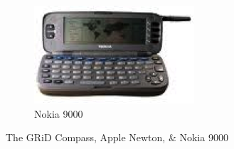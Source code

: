 \begin{figure}[htb]
\begin{subfigure}[b]{0.3\textwidth}
                \includegraphics[width=\textwidth]{images/nokia-9000}
                \caption{Nokia 9000}
                \label{fig:nokia-9000}
        \end{subfigure}
        \caption{The GRiD Compass, Apple Newton, \& Nokia 9000}\label{fig:early-mobile-platforms-1}
\end{figure}

